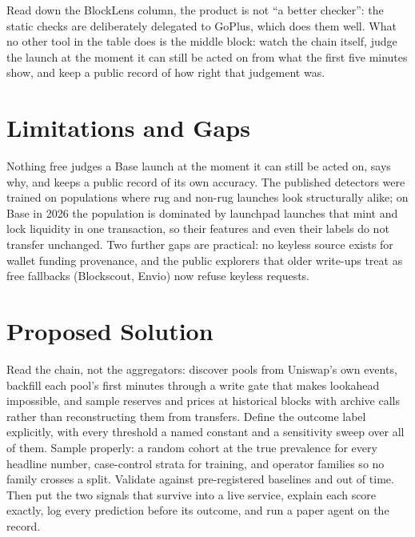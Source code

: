 Read down the BlockLens column, the product is not ``a better checker'': the static checks are deliberately delegated to GoPlus, which does them well. What no other tool in the table does is the middle block: watch the chain itself, judge the launch at the moment it can still be acted on from what the first five minutes show, and keep a public record of how right that judgement was.

\section{Limitations and Gaps}
Nothing free judges a Base launch at the moment it can still be acted on, says why, and keeps a public record of its own accuracy. The published detectors were trained on populations where rug and non-rug launches look structurally alike; on Base in 2026 the population is dominated by launchpad launches that mint and lock liquidity in one transaction, so their features and even their labels do not transfer unchanged. Two further gaps are practical: no keyless source exists for wallet funding provenance, and the public explorers that older write-ups treat as free fallbacks (Blockscout, Envio) now refuse keyless requests.

\section{Proposed Solution}
Read the chain, not the aggregators: discover pools from Uniswap's own events, backfill each pool's first minutes through a write gate that makes lookahead impossible, and sample reserves and prices at historical blocks with archive calls rather than reconstructing them from transfers. Define the outcome label explicitly, with every threshold a named constant and a sensitivity sweep over all of them. Sample properly: a random cohort at the true prevalence for every headline number, case-control strata for training, and operator families so no family crosses a split. Validate against pre-registered baselines and out of time. Then put the two signals that survive into a live service, explain each score exactly, log every prediction before its outcome, and run a paper agent on the record.

